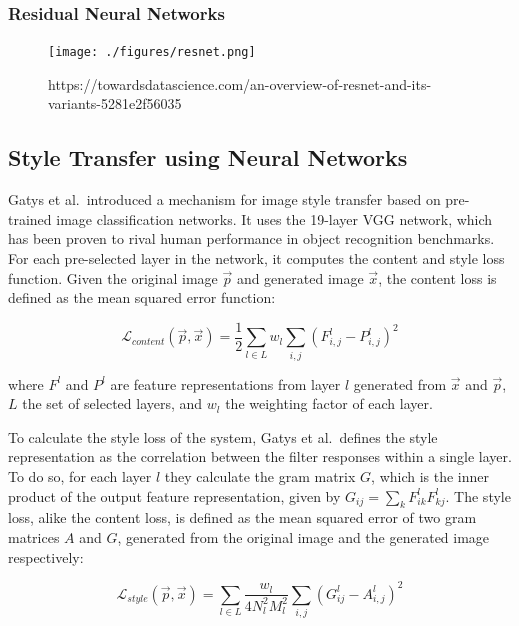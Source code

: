 \documentclass[]{article}
\begin{document}
\hypertarget{residual-neural-networks}{%
\subsubsection{Residual Neural
Networks}\label{residual-neural-networks}}

\begin{figure}[h]
    \texttt{[image: ./figures/resnet.png]}
    \centering
    \caption{https://towardsdatascience.com/an-overview-of-resnet-and-its-variants-5281e2f56035}
\end{figure}

\hypertarget{style-transfer-using-neural-networks}{%
\subsection{Style Transfer using Neural
Networks}\label{style-transfer-using-neural-networks}}

Gatys et al.~introduced a mechanism for image style transfer based on
pre-trained image classification networks. It uses the 19-layer VGG
network, which has been proven to rival human performance in object
recognition benchmarks. For each pre-selected layer in the network, it
computes the content and style loss function. Given the original image
\(\vec{p}\) and generated image \(\vec{x}\), the content loss is defined
as the mean squared error function:

\begin{equation}
    \mathcal{L}_{content}(\vec{p}, \vec{x}) = \frac{1}{2} \sum_{l \in L} w_l \sum_{i,j} (F^l_{i, j} - P^l_{i, j})^2
\end{equation}

where \(F^l\) and \(P^l\) are feature representations from layer \(l\)
generated from \(\vec{x}\) and \(\vec{p}\), \(L\) the set of selected
layers, and \(w_l\) the weighting factor of each layer.

To calculate the style loss of the system, Gatys et al.~defines the
style representation as the correlation between the filter responses
within a single layer. To do so, for each layer \(l\) they calculate the
gram matrix \(G\), which is the inner product of the output feature
representation, given by \(G_{ij} = \sum_{k} F^l_{ik} F^l_{kj}\). The
style loss, alike the content loss, is defined as the mean squared error
of two gram matrices \(A\) and \(G\), generated from the original image
and the generated image respectively:

\begin{equation}
    \mathcal{L}_{style}(\vec{p}, \vec{x}) =  \sum_{l \in L} \frac{w_l}{4 N_l^2 M_l^2} \sum_{i, j} (G^l_{ij} - A^l_{i, j})^2
\end{equation}
\end{document}
